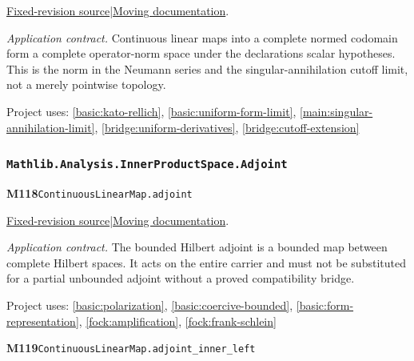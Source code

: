 \documentclass[11pt,a4paper]{article}
\theoremstyle{definition}
\theoremstyle{remark}
\begin{document}
\href{https://github.com/leanprover-community/mathlib4/blob/9bac2d0692944a775113f7c130fd5e5b4608a854/Mathlib/Topology/Algebra/Module/Spaces/ContinuousLinearMap.lean}{Fixed-revision source}\quad|\quad\href{https://leanprover-community.github.io/mathlib4_docs/Mathlib/Topology/Algebra/Module/Spaces/ContinuousLinearMap.html#ContinuousLinearMap.instCompleteSpace}{Moving documentation}.\par
\noindent\textit{Application contract.} Continuous linear maps into a complete normed codomain form a complete operator-norm space under the declaration\textquotesingle s scalar hypotheses. This is the norm in the Neumann series and the singular-annihilation cutoff limit, not a merely pointwise topology.\par
{\small Project uses: \ref{basic:kato-rellich}, \ref{basic:uniform-form-limit}, \ref{main:singular-annihilation-limit}, \ref{bridge:uniform-derivatives}, \ref{bridge:cutoff-extension}}\par\medskip

\subsubsection*{\nolinkurl{Mathlib.Analysis.InnerProductSpace.Adjoint}}
\noindent\textbf{M118}\label{base:M118}\quad\nolinkurl{ContinuousLinearMap.adjoint}

\href{https://github.com/leanprover-community/mathlib4/blob/9bac2d0692944a775113f7c130fd5e5b4608a854/Mathlib/Analysis/InnerProductSpace/Adjoint.lean}{Fixed-revision source}\quad|\quad\href{https://leanprover-community.github.io/mathlib4_docs/Mathlib/Analysis/InnerProductSpace/Adjoint.html#ContinuousLinearMap.adjoint}{Moving documentation}.\par
\noindent\textit{Application contract.} The bounded Hilbert adjoint is a bounded map between complete Hilbert spaces. It acts on the entire carrier and must not be substituted for a partial unbounded adjoint without a proved compatibility bridge.\par
{\small Project uses: \ref{basic:polarization}, \ref{basic:coercive-bounded}, \ref{basic:form-representation}, \ref{fock:amplification}, \ref{fock:frank-schlein}}\par\medskip

\noindent\textbf{M119}\label{base:M119}\quad\nolinkurl{ContinuousLinearMap.adjoint_inner_left}
\end{document}
